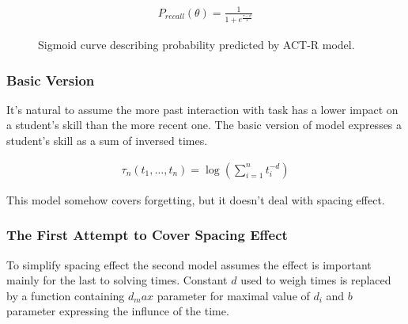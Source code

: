 \documentclass[a4paper]{article}
\begin{document}
\begin{align}
P_{recall}(\theta) = \frac{1}{1 + e^{\frac{\tau - \theta}{s}}}
\end{align}

\begin{figure}[H]
\begin{center}
\end{center}
\label{actr}
\caption{Sigmoid curve describing probability predicted by ACT-R model.}
\end{figure}

\subsubsection{Basic Version}

It's natural to assume the more past interaction with task has a lower impact on a student's skill
than the more recent one. The basic version of model expresses a student's skill as a sum of
inversed times.

\begin{align}
\tau_n(t_1, \ldots, t_n) = \log\left(\sum_{i=1}^{n} t_i^{-d} \right)
\end{align}

This model somehow covers forgetting, but it doesn't deal with spacing effect.

\subsubsection{The First Attempt to Cover Spacing Effect}

To simplify spacing effect the second model assumes the effect is important mainly for the last to
solving times. Constant $d$ used to weigh times is replaced by a function containing $d_max$ parameter for
maximal value of $d_i$ and $b$ parameter expressing the influnce of the time.
\end{document}

